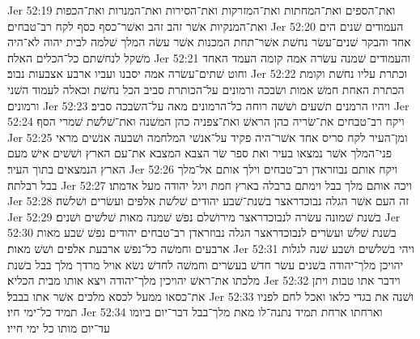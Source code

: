 Jer 52:19  ואת־הספים ואת־המחתות ואת־המזרקות ואת־הסירות ואת־המנרות ואת־הכפות ואת־המנקיות אשׁר זהב זהב ואשׁר־כסף כסף לקח רב־טבחים׃
Jer 52:20  העמודים שׁנים הים אחד והבקר שׁנים־עשׂר נחשׁת אשׁר־תחת המכנות אשׁר עשׂה המלך שׁלמה לבית יהוה לא־היה משׁקל לנחשׁתם כל־הכלים האלה׃
Jer 52:21  והעמודים שׁמנה עשׂרה אמה קומה העמד האחד וחוט שׁתים־עשׂרה אמה יסבנו ועביו ארבע אצבעות נבוב׃
Jer 52:22  וכתרת עליו נחשׁת וקומת הכתרת האחת חמשׁ אמות ושׂבכה ורמונים על־הכותרת סביב הכל נחשׁת וכאלה לעמוד השׁני ורמונים׃
Jer 52:23  ויהיו הרמנים תשׁעים ושׁשׁה רוחה כל־הרמונים מאה על־השׂבכה סביב׃
Jer 52:24  ויקח רב־טבחים את־שׂריה כהן הראשׁ ואת־צפניה כהן המשׁנה ואת־שׁלשׁת שׁמרי הסף׃
Jer 52:25  ומן־העיר לקח סריס אחד אשׁר־היה פקיד על־אנשׁי המלחמה ושׁבעה אנשׁים מראי פני־המלך אשׁר נמצאו בעיר ואת ספר שׂר הצבא המצבא את־עם הארץ ושׁשׁים אישׁ מעם הארץ הנמצאים בתוך העיר׃
Jer 52:26  ויקח אותם נבוזראדן רב־טבחים וילך אותם אל־מלך בבל רבלתה׃
Jer 52:27  ויכה אותם מלך בבל וימתם ברבלה בארץ חמת ויגל יהודה מעל אדמתו׃
Jer 52:28  זה העם אשׁר הגלה נבוכדראצר בשׁנת־שׁבע יהודים שׁלשׁת אלפים ועשׂרים ושׁלשׁה׃
Jer 52:29  בשׁנת שׁמונה עשׂרה לנבוכדראצר מירושׁלם נפשׁ שׁמנה מאות שׁלשׁים ושׁנים׃
Jer 52:30  בשׁנת שׁלשׁ ועשׂרים לנבוכדראצר הגלה נבוזראדן רב־טבחים יהודים נפשׁ שׁבע מאות ארבעים וחמשׁה כל־נפשׁ ארבעת אלפים ושׁשׁ מאות׃
Jer 52:31  ויהי בשׁלשׁים ושׁבע שׁנה לגלות יהויכן מלך־יהודה בשׁנים עשׂר חדשׁ בעשׂרים וחמשׁה לחדשׁ נשׂא אויל מרדך מלך בבל בשׁנת מלכתו את־ראשׁ יהויכין מלך־יהודה ויצא אותו מבית הכליא׃
Jer 52:32  וידבר אתו טבות ויתן את־כסאו ממעל לכסא מלכים אשׁר אתו בבבל׃
Jer 52:33  ושׁנה את בגדי כלאו ואכל לחם לפניו תמיד כל־ימי חיו׃
Jer 52:34  וארחתו ארחת תמיד נתנה־לו מאת מלך־בבל דבר־יום ביומו עד־יום מותו כל ימי חייו׃


